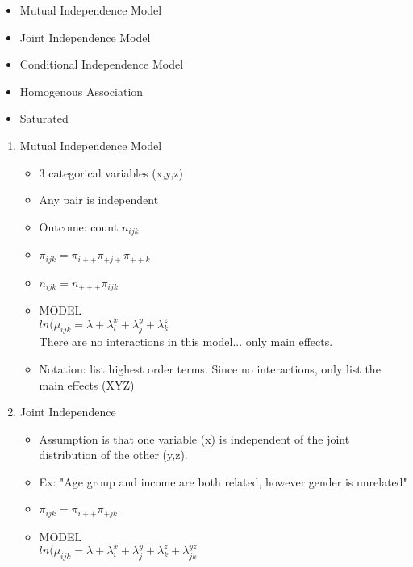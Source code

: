 \documentclass[12 pt]{article}
\begin{document}
\begin{enumerate}
            \begin{itemize}
                \item Mutual Independence Model
                \item Joint Independence Model
                \item Conditional Independence Model
                \item Homogenous Association
                \item Saturated
            \end{itemize}
            \begin{enumerate}
                \item Mutual Independence Model
                    \begin{itemize}
                        \item 3 categorical variables (x,y,z)
                        \item Any pair is independent
                        \item Outcome: count \( n_{ijk} \)
                        \item \( \pi_{ijk} = \pi_{i++} \pi_{+j+} \pi_{++k} \)
                        \item \( n_{ijk} = n_{+++} \pi_{ijk} \)
                        \item MODEL \\
                            $ln(\mu_{ijk} = \lambda + \lambda^x_i + \lambda^y_j + \lambda^z_k$ \\
                            There are no interactions in this model... only main effects. 
                        \item Notation: list highest order terms. Since no interactions, only list the main effects (XYZ)
                    \end{itemize}
                \item Joint Independence
                    \begin{itemize}
                        \item Assumption is that one variable (x) is independent of the joint distribution of the other (y,z). 
                        \item Ex: "Age group and income are both related, however gender is unrelated"
                        \item \( \pi_{ijk} = \pi_{i++} \pi_{+jk} \)
                        \item MODEL \\
                            $ln(\mu_{ijk} = \lambda + \lambda^x_i + \lambda^y_j + \lambda^z_k + \lambda^{yz}_{jk}$ \\

\end{itemize}
\end{enumerate}
\end{enumerate}
\end{document}
